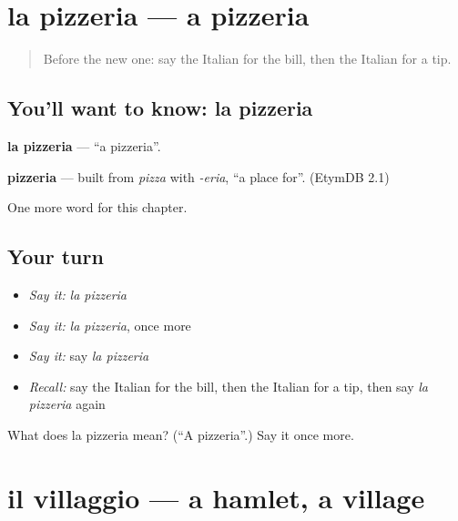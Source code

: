 \section[la pizzeria]{la pizzeria — a pizzeria}

\label{lesson:IT-C160-pizzeria}



\begin{quote}
Before the new one: say the Italian for the bill, then the Italian for a tip.
\end{quote}

\subsection*{You'll want to know: la pizzeria}
\textbf{la pizzeria} — \textquotedblleft{}a pizzeria\textquotedblright{}.

\begin{cousinweb}
\textbf{pizzeria} — built from \emph{pizza} with \emph{-eria}, \textquotedblleft{}a place for\textquotedblright{}. (EtymDB 2.1)
\end{cousinweb}

\begin{grammarlens}[title={What you've built}]
One more word for this chapter.
\end{grammarlens}

\subsection*{Your turn}
\begin{itemize}
\raggedright
  \item \emph{Say it:} \emph{la pizzeria}
  \item \emph{Say it:} \emph{la pizzeria}, once more
  \item \emph{Say it:} say \emph{la pizzeria}
  \item \emph{Recall:} say the Italian for the bill, then the Italian for a tip, then say \emph{la pizzeria} again
\end{itemize}

\begin{tcolorbox}[breakable,colback=teal!4,colframe=teal!35!black,title={Before you move on}]
What does la pizzeria mean? (\textquotedblleft{}A pizzeria\textquotedblright{}.) Say it once more.
\end{tcolorbox}
\section[il villaggio]{il villaggio — a hamlet, a village}

